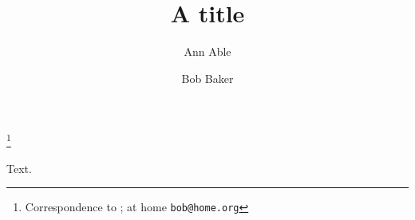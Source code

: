 \documentclass{amsart}
\newcommand{\emailAdd}[1]{\texttt{#1}}
\begin{document}
\title{A title}
\author{Ann Able}
\address{University X, Town}
\author{Bob Baker}
\address{University Y, City}
\thanks{Correspondence to ; at home \emailAdd{bob@home.org}}
\maketitle
Text.
\end{document}
